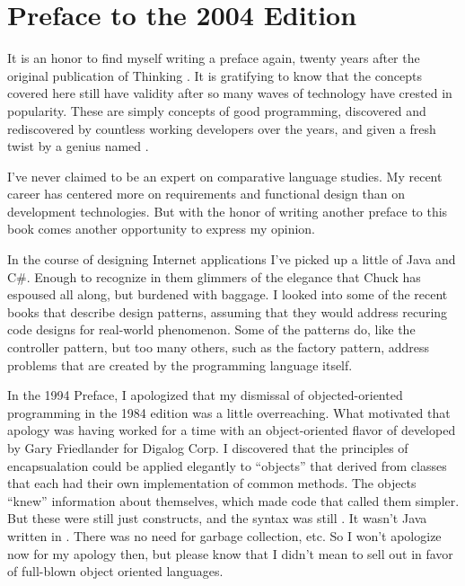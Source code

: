 \chapter*{Preface to the 2004 Edition}
\pagestyle{headings}

It is an honor to find myself writing a preface again, twenty years
after the original publication of Thinking \Forth{}. It is gratifying to
know that the concepts covered here still have validity after so many
waves of technology have crested in popularity. These are simply
concepts of good programming, discovered and rediscovered by countless
working developers over the years, and given a fresh twist by a genius
named .

I've never claimed to be an expert on comparative language studies. My
recent career has centered more on requirements and functional design
than on development technologies. But with the honor of writing
another preface to this book comes another opportunity to express my
opinion.

In the course of designing Internet applications I've picked up a
little of Java and C\#. Enough to recognize in them glimmers of the
elegance that Chuck has espoused all along, but burdened with
baggage. I looked into some of the recent books that describe design
patterns, assuming that they would address recuring code designs for
real-world phenomenon. Some of the patterns do, like the controller
pattern, but too many others, such as the factory pattern, address
problems that are created by the programming language itself.

In the 1994 Preface, I apologized that my dismissal of
objected-oriented programming in the 1984 edition was a little
overreaching. What motivated that apology was having worked for a time
with an object-oriented flavor of \Forth{} developed by Gary Friedlander
for Digalog Corp. I discovered that the principles of encapsualation
could be applied elegantly to \Forth{} ``objects'' that derived from
classes that each had their own implementation of common methods. The
objects ``knew'' information about themselves, which made code that
called them simpler. But these were still just \Forth{} constructs, and
the syntax was still \Forth{}. It wasn't Java written in \Forth{}. There was
no need for garbage collection, etc. So I won't apologize now for my
apology then, but please know that I didn't mean to sell out in favor
of full-blown object oriented languages.

